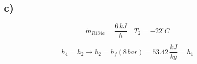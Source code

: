 

\subsection*{c)}

\[
\dot{m}_{R134a} = \frac{6 \, kJ}{h} \quad T_2 = -22^\circ C
\]

\[
h_4 = h_2 \rightarrow h_2 = h_f(8 \, bar) = 53.42 \, \frac{kJ}{kg} = h_1
\]